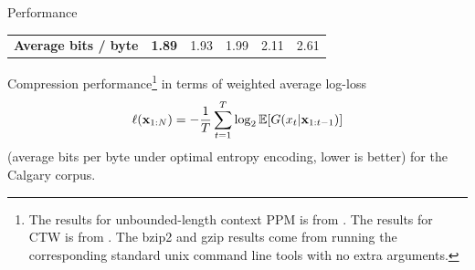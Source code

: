 \documentclass[16pt]{beamer}
\begin{document}
{\begin{block}{Performance}
\begin{table}[t]
\begin{center}
\begin{tabular}{l||r|c|c|c|c}
\textbf{Average bits / byte}      &{\bf 1.89}   & 1.93  &  1.99 & 2.11 & 2.61 \\%
\end{tabular}
\end{center}
\label{table:results}
\end{table}
\end{block}
Compression performance\footnote{The results for unbounded-length context PPM is from 
\cite{Cleary1997b}. The results for CTW is from \cite{Willems2009}.   The
bzip2 and gzip results come from running the corresponding standard unix
command line tools with no extra arguments.} in terms of weighted average log-loss
\[\ell(\xbf_{1:N}) = -\frac{1}{T}\sum_{t=1}^T \log_2 \EE[G(x_t|\xbf_{1:t-1})]\]
(average bits per byte under optimal entropy encoding, lower is better) for
the Calgary corpus.


}
\end{document}
